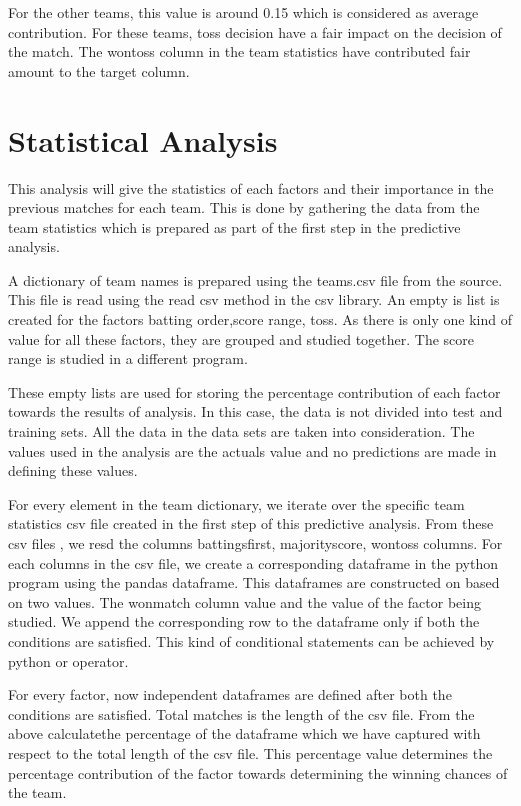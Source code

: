 \documentclass[sigconf]{acmart}
\begin{document}
For the other teams, this value is around 0.15 which is considered as average contribution. For these teams, toss decision have a fair impact on the decision of the match. The wontoss column in the team statistics  have contributed fair amount to the target column.

 
\section{Statistical Analysis}
This analysis will give the statistics of each factors and their importance in the previous matches for each team. This is done by gathering the data from the team statistics which is prepared as part of the first step in the predictive analysis. 

A dictionary of team names is prepared using the teams.csv file from the source. This file is read using the read csv method in the csv library. An empty is list is created for the factors batting order,score range, toss. As there is only one kind of value for all these factors, they are grouped and studied together. The score range is studied in a different program. 

These empty lists are used for storing the percentage contribution of each factor towards the results of analysis. In this case, the data is not divided into test and training sets. All the data in the data sets are taken into consideration. The values used in the analysis are the actuals value and no predictions are made in defining these values. 

For every element in the team dictionary, we iterate over the specific team statistics csv file created in the first step of this predictive analysis. From these csv files , we resd the columns battingsfirst, majorityscore, wontoss columns. For each columns in the csv file, we create a corresponding dataframe in the python program using the pandas dataframe.  This dataframes are constructed on based on two values. The wonmatch column value and the value of the factor being studied. We append the corresponding row to the dataframe only if both the conditions are satisfied. This kind of conditional statements can be achieved by python or operator. 

For every factor, now independent dataframes are defined after both the  conditions are satisfied. Total matches is the length of the csv file. From the above calculatethe percentage of the dataframe which we have captured with respect to the total length of the csv file. This percentage value determines the percentage contribution of the factor towards determining the winning chances of the team.
\end{document}
